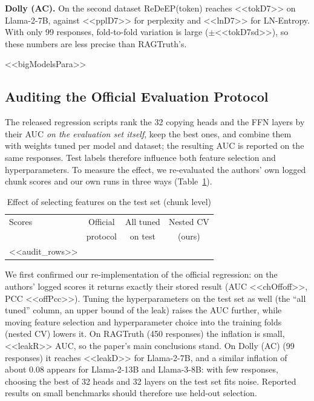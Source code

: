 \documentclass[conference]{IEEEtran}
\begin{document}
\textbf{Dolly (AC).} On the second dataset ReDeEP(token) reaches <<tokD7>> on Llama-2-7B, against <<pplD7>> for perplexity and <<lnD7>> for LN-Entropy. With only 99 responses, fold-to-fold variation is large ($\pm$<<tokD7sd>>), so these numbers are less precise than RAGTruth's.

<<bigModelsPara>>

\subsection{Auditing the Official Evaluation Protocol}
\label{sec:audit}
The released regression scripts rank the 32 copying heads and the FFN layers by their AUC \emph{on the evaluation set itself}, keep the best ones, and combine them with weights tuned per model and dataset; the resulting AUC is reported on the same responses. Test labels therefore influence both feature selection and hyperparameters. To measure the effect, we re-evaluated the authors' own logged chunk scores and our own runs in three ways (Table~\ref{tab:audit}).

\begin{table}[t]
\caption{Effect of selecting features on the test set (chunk level)}
\label{tab:audit}
\centering\footnotesize
\setlength{\tabcolsep}{3pt}
\begin{tabular}{@{}lccc@{}}
\toprule
Scores & Official & All tuned & Nested CV \\
& protocol & on test & (ours) \\
\midrule
<<audit_rows>>
\bottomrule
\end{tabular}
\end{table}

We first confirmed our re-implementation of the official regression: on the authors' logged scores it returns exactly their stored result (AUC <<chOffoff>>, PCC <<offPcc>>). Tuning the hyperparameters on the test set as well (the ``all tuned'' column, an upper bound of the leak) raises the AUC further, while moving feature selection and hyperparameter choice into the training folds (nested CV) lowers it. On RAGTruth (450 responses) the inflation is small, <<leakR>> AUC, so the paper's main conclusions stand. On Dolly (AC) (99 responses) it reaches <<leakD>> for Llama-2-7B, and a similar inflation of about 0.08 appears for Llama-2-13B and Llama-3-8B: with few responses, choosing the best of 32 heads and 32 layers on the test set fits noise. Reported results on small benchmarks should therefore use held-out selection.
\end{document}
